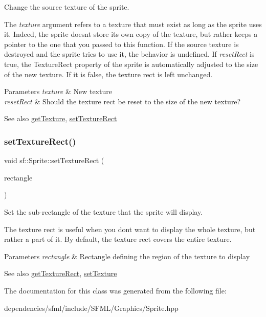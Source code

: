 Change the source texture of the sprite. 

The {\itshape texture} argument refers to a texture that must exist as long as the sprite uses it. Indeed, the sprite doesn\textquotesingle{}t store its own copy of the texture, but rather keeps a pointer to the one that you passed to this function. If the source texture is destroyed and the sprite tries to use it, the behavior is undefined. If {\itshape reset\+Rect} is true, the Texture\+Rect property of the sprite is automatically adjusted to the size of the new texture. If it is false, the texture rect is left unchanged.


\begin{DoxyParams}{Parameters}
{\em texture} & New texture \\
\hline
{\em reset\+Rect} & Should the texture rect be reset to the size of the new texture?\\
\hline
\end{DoxyParams}
\begin{DoxySeeAlso}{See also}
\hyperlink{classsf_1_1_sprite_a1a76155146c8ff37c4eb5a306b4e9ebe}{get\+Texture}, \hyperlink{classsf_1_1_sprite_a3fefec419a4e6a90c0fd54c793d82ec2}{set\+Texture\+Rect} 
\end{DoxySeeAlso}
\mbox{\label{classsf_1_1_sprite_a3fefec419a4e6a90c0fd54c793d82ec2}} 
\subsubsection{\texorpdfstring{set\+Texture\+Rect()}{setTextureRect()}}
{\footnotesize\ttfamily void sf\+::\+Sprite\+::set\+Texture\+Rect (\begin{DoxyParamCaption}\item[{const \hyperlink{classsf_1_1_rect}{Int\+Rect} \&}]{rectangle }\end{DoxyParamCaption})}



Set the sub-\/rectangle of the texture that the sprite will display. 

The texture rect is useful when you don\textquotesingle{}t want to display the whole texture, but rather a part of it. By default, the texture rect covers the entire texture.


\begin{DoxyParams}{Parameters}
{\em rectangle} & Rectangle defining the region of the texture to display\\
\hline
\end{DoxyParams}
\begin{DoxySeeAlso}{See also}
\hyperlink{classsf_1_1_sprite_a3492896fe7b63f58ae022c5b8bec5c98}{get\+Texture\+Rect}, \hyperlink{classsf_1_1_sprite_a3729c88d88ac38c19317c18e87242560}{set\+Texture} 
\end{DoxySeeAlso}


The documentation for this class was generated from the following file\+:\begin{DoxyCompactItemize}
\item 
dependencies/sfml/include/\+S\+F\+M\+L/\+Graphics/Sprite.\+hpp\end{DoxyCompactItemize}
